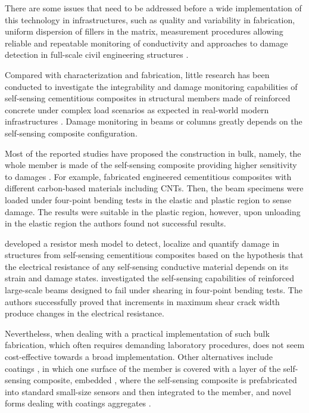 \documentclass[twocolumn]{bmcart}%
\begin{document}
There are some issues that need to be addressed before a wide implementation of this technology in infrastructures, such as quality and variability in fabrication, uniform dispersion of fillers in the matrix, measurement procedures allowing reliable and repeatable monitoring of conductivity and approaches to damage detection in full-scale civil engineering structures \cite{Tian2019a, DAlessandro2016a, Shi2019b}.

Compared with characterization and fabrication, little research has been conducted to investigate the integrability and damage monitoring capabilities of self-sensing cementitious composites in structural members made of reinforced concrete under complex load scenarios as expected in real-world modern infrastructures \cite{Lagason2016, You2017, Al-Dahawi2017a, Naeem2017a}. Damage monitoring in beams or columns greatly depends on the self-sensing composite configuration. 

Most of the reported studies have proposed the construction in bulk, namely, the whole member is made of the self-sensing composite providing higher sensitivity to damages \cite{Hannan2018a, Lagason2016, Al-Dahawi2017a, Downey2017a, Gupta2017a, You2017, Yldrm2018}. For example, \citet{Al-Dahawi2017a} fabricated engineered cementitious composites with different carbon-based materials including CNTs. Then, the beam specimens were loaded under four-point bending tests in the elastic and plastic region to sense damage. The results were suitable in the plastic region, however, upon unloading in the elastic region the authors found not successful results. 

\citet{Downey2017} developed a resistor mesh model to detect, localize and quantify damage in structures from self-sensing cementitious composites based on the hypothesis that the electrical resistance of any self-sensing conductive material depends on its strain and damage states. \citet{Yldrm2018} investigated the self-sensing capabilities of reinforced large-scale beams designed to fail under shearing in four-point bending tests. The authors successfully proved that increments in maximum shear crack width produce changes in the electrical resistance.

Nevertheless, when dealing with a practical implementation of such bulk fabrication, which often requires demanding laboratory procedures, does not seem cost-effective towards a broad implementation. Other alternatives include coatings \cite{Downey2017, Downey2018e, Nespor2018a}, in which one surface of the member is covered with a layer of the self-sensing composite, embedded \cite{Meoni2018a, Saafi2009, DAlessandro2017}, where the self-sensing composite is prefabricated into standard small-size sensors and then integrated to the member, and novel forms dealing with coatings aggregates \cite{Han2015b, Gupta2017a, Loh2015a}.
\end{document}
